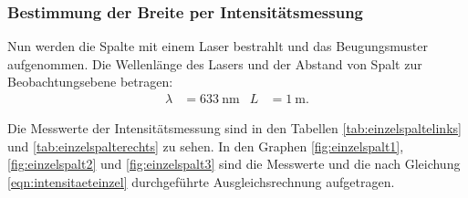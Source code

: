 \subsubsection{Bestimmung der Breite per Intensitätsmessung}

Nun werden die Spalte mit einem Laser bestrahlt und das Beugungsmuster aufgenommen.
Die Wellenlänge des Lasers und der Abstand von Spalt zur Beobachtungsebene betragen:
\begin{align*}
  \lambda &= \SI{633}{\nano\meter} & L &= \SI{1}{\meter}.
\end{align*}

Die Messwerte der Intensitätsmessung sind in den Tabellen \ref{tab:einzelspaltelinks} und \ref{tab:einzelspalterechts}
zu sehen. In den Graphen \ref{fig:einzelspalt1}, \ref{fig:einzelspalt2} und
\ref{fig:einzelspalt3} sind die Messwerte und die nach Gleichung \eqref{eqn:intensitaeteinzel}
durchgeführte Ausgleichsrechnung aufgetragen.

